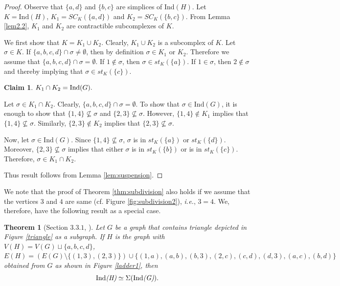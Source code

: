 \documentclass[12pt]{article}
\newtheorem{thm}{Theorem}
\numberwithin{thm}{section}
\newtheorem{claim}{Claim}
\theoremstyle{definition}
\newcommand{\ind}{{\rm{Ind}}}
\begin{document}
\begin{proof}
Observe that $\{a,d\}$ and $\{b,c\}$ are simplices of Ind$(H)$. Let $K=\text{Ind}(H)$, $K_1=SC_{K}(\{a,d\})$ and $K_2=SC_{K}(\{b,c\})$. From Lemma \ref{lem2.2}, $K_1$ and $K_2$ are contractible subcomplexes of $K$. 

We  first show that $K=K_1 \cup K_2.$ Clearly, $K_1 \cup K_2$ is a subcomplex of $K$. Let $\sigma \in K$. If $\{a,b,c,d\} \cap \sigma \neq \emptyset$, then by definition $\sigma \in K_1$ or $K_2$. Therefore we assume that  $\{a,b,c,d\} \cap \sigma = \emptyset$. If $1 \notin \sigma$, then $\sigma \in st_K(\{a\})$. If $1 \in \sigma$, then $2 \notin \sigma$ and thereby implying that $\sigma \in st_K(\{c\})$. 

\begin{claim}\label{claim2}
$K_1 \cap K_2=\ind(G).$
\end{claim}
Let $\sigma \in K_1\cap K_2$. Clearly, $\{a,b,c,d\} \cap \sigma =\emptyset$. To show that $\sigma \in \text{Ind}(G)$, it is enough to show that $\{1,4\}\nsubseteq \sigma$ and $\{2,3\} \nsubseteq \sigma$. However, $\{1,4\} \notin K_1$ implies that $\{1,4\}\nsubseteq \sigma$. Similarly, $\{2,3\}\notin K_2$ implies that $\{2,3\} \nsubseteq \sigma$. 

Now, let $\sigma \in \text{Ind}(G)$. Since $\{1,4\}\nsubseteq \sigma$, $\sigma$ is in $st_K(\{a\})$ or $st_K(\{d\})$. Moreover, $\{2,3\}\nsubseteq \sigma$ implies that either $\sigma$ is in $st_K(\{b\})$ or is in $st_K(\{c\})$. Therefore, $\sigma \in K_1 \cap K_2.$

Thus result follows from Lemma \ref{lem:suspension}.
\end{proof}

    We note that the proof of Theorem \ref{thm:subdivision} also holds if we assume that the vertices $3$ and $4$ are same (cf. Figure \ref{fig:subdivision2}), {\it i.e.}, $3=4$. We, therefore, have the following result as a special case.

\begin{thm}[Section $3.3.1$, \cite{JS10}]\label{thm:subdivision1}
	Let $G$ be a graph that contains triangle  depicted in Figure \ref{triangle} as a subgraph. If  $H$ is the graph with $V(H) = V(G) \sqcup \{a,b,c,d\}$, $E(H) = (E(G) \setminus \{(1,3), (2,3)\}) \cup \{(1,a), (a,b), (b,3), (2,c), (c,d), (d,3), (a,c), (b,d)\}$  obtained from $G$ as shown in Figure \ref{ladder1}, then    
	$$\emph{\ind(H)}\simeq \Sigma(\emph{\ind(G)}).$$ 
\end{thm}
\end{document}
